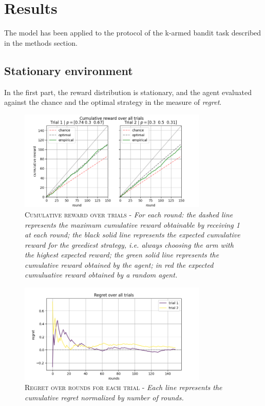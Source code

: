 
\section{Results}

The model has been applied to the protocol of the k-armed bandit task described in the methods section.



\subsection{Stationary environment}
In the first part, the reward distribution is stationary, and the agent evaluated against the chance and the optimal strategy in the measure of \textit{regret}.


\begin{figure}[ht]
    \centering
    \includegraphics[width=0.8\textwidth]{figures/hsnn_results_trials_1.png}
    \caption{\textsc{Cumulative reward over trials - }\textit{For each round: the dashed line represents the maximum cumulative reward obtainable by receiving 1 at each round; the black solid line represents the expected cumulative reward for the greediest strategy, i.e. always choosing the arm with the
    highest expected reward; the green solid line represents the cumulative reward obtained by the agent; in red the expected cumuluative reward obtained by a random agent.}}
    \label{fig:results_trials_1}
\end{figure}

\begin{figure}[ht]
    \centering
    \includegraphics[width=0.8\textwidth]{figures/hsnn_results_regret_1.png}
    \caption{\textsc{Regret over rounds for each trial - }\textit{Each line represents the cumulative regret normalized by number of rounds.}}
    \label{fig:results_regret_1}
\end{figure}


